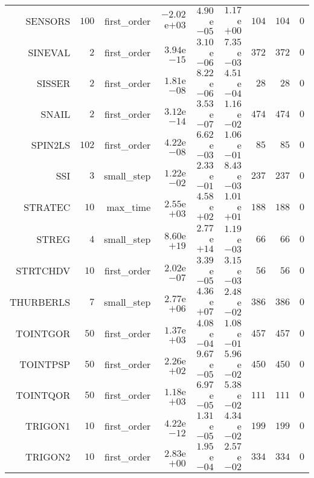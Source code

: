 \begin{longtable}{rrrrrrrrr}
SENSORS & \(   100\) & first\_order & \(-2.02\)e\(+03\) & \( 4.90\)e\(-05\) & \( 1.17\)e\(+00\) & \(   104\) & \(   104\) & \(     0\) \\
SINEVAL & \(     2\) & first\_order & \( 3.94\)e\(-15\) & \( 3.10\)e\(-06\) & \( 7.35\)e\(-03\) & \(   372\) & \(   372\) & \(     0\) \\
SISSER & \(     2\) & first\_order & \( 1.81\)e\(-08\) & \( 8.22\)e\(-06\) & \( 4.51\)e\(-04\) & \(    28\) & \(    28\) & \(     0\) \\
SNAIL & \(     2\) & first\_order & \( 3.12\)e\(-14\) & \( 3.53\)e\(-07\) & \( 1.16\)e\(-02\) & \(   474\) & \(   474\) & \(     0\) \\
SPIN2LS & \(   102\) & first\_order & \( 4.22\)e\(-08\) & \( 6.62\)e\(-03\) & \( 1.06\)e\(-01\) & \(    85\) & \(    85\) & \(     0\) \\
SSI & \(     3\) & small\_step & \( 1.22\)e\(-02\) & \( 2.33\)e\(-01\) & \( 8.43\)e\(-03\) & \(   237\) & \(   237\) & \(     0\) \\
STRATEC & \(    10\) & max\_time & \( 2.55\)e\(+03\) & \( 4.58\)e\(+02\) & \( 1.01\)e\(+01\) & \(   188\) & \(   188\) & \(     0\) \\
STREG & \(     4\) & small\_step & \( 8.60\)e\(+19\) & \( 2.77\)e\(+14\) & \( 1.19\)e\(-03\) & \(    66\) & \(    66\) & \(     0\) \\
STRTCHDV & \(    10\) & first\_order & \( 2.02\)e\(-07\) & \( 3.39\)e\(-05\) & \( 3.15\)e\(-03\) & \(    56\) & \(    56\) & \(     0\) \\
THURBERLS & \(     7\) & small\_step & \( 2.77\)e\(+06\) & \( 4.36\)e\(+07\) & \( 2.48\)e\(-02\) & \(   386\) & \(   386\) & \(     0\) \\
TOINTGOR & \(    50\) & first\_order & \( 1.37\)e\(+03\) & \( 4.08\)e\(-04\) & \( 1.08\)e\(-01\) & \(   457\) & \(   457\) & \(     0\) \\
TOINTPSP & \(    50\) & first\_order & \( 2.26\)e\(+02\) & \( 9.67\)e\(-05\) & \( 5.96\)e\(-02\) & \(   450\) & \(   450\) & \(     0\) \\
TOINTQOR & \(    50\) & first\_order & \( 1.18\)e\(+03\) & \( 6.97\)e\(-05\) & \( 5.38\)e\(-02\) & \(   111\) & \(   111\) & \(     0\) \\
TRIGON1 & \(    10\) & first\_order & \( 4.22\)e\(-12\) & \( 1.31\)e\(-05\) & \( 4.34\)e\(-02\) & \(   199\) & \(   199\) & \(     0\) \\
TRIGON2 & \(    10\) & first\_order & \( 2.83\)e\(+00\) & \( 1.95\)e\(-04\) & \( 2.57\)e\(-02\) & \(   334\) & \(   334\) & \(     0\) \\

\end{longtable}
